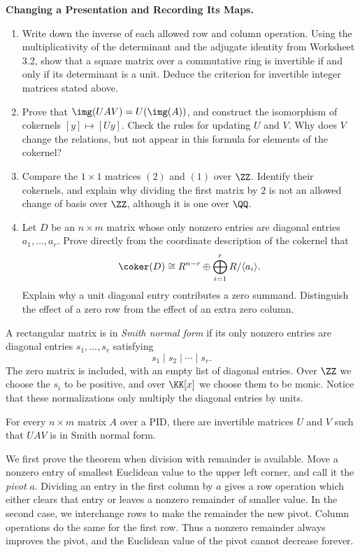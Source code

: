 \documentclass[12pt,reqno]{amsart}
\begin{document}
\begin{problems}
\item\label{s:presentations} \textbf{Changing a Presentation and Recording Its Maps.}
\begin{enumerate}
\item Write down the inverse of each allowed row and column operation. Using the multiplicativity of the determinant and the adjugate identity from Worksheet 3.2, show that a square matrix over a commutative ring is invertible if and only if its determinant is a unit. Deduce the criterion for invertible integer matrices stated above.
\item Prove that $\img(UAV)=U(\img(A))$, and construct the isomorphism of cokernels $[y]\mapsto[Uy]$. Check the rules for updating $U$ and $V$. Why does $V$ change the relations, but not appear in this formula for elements of the cokernel?
\item Compare the $1\times1$ matrices $(2)$ and $(1)$ over $\ZZ$. Identify their cokernels, and explain why dividing the first matrix by $2$ is not an allowed change of basis over $\ZZ$, although it is one over $\QQ$.
\item Let $D$ be an $n\times m$ matrix whose only nonzero entries are diagonal entries $a_1,\ldots,a_r$. Prove directly from the coordinate description of the cokernel that
\[
\coker(D)\cong R^{n-r}\oplus\bigoplus_{i=1}^rR/\langle a_i\rangle.
\]
Explain why a unit diagonal entry contributes a zero summand. Distinguish the effect of a zero row from the effect of an extra zero column.
\end{enumerate}
\end{problems}

\hrulefill

A rectangular matrix is in \emph{Smith normal form} if its only nonzero entries are diagonal entries $s_1,\ldots,s_r$ satisfying
\[
s_1\mid s_2\mid\cdots\mid s_r.
\]
The zero matrix is included, with an empty list of diagonal entries. Over $\ZZ$ we choose the $s_i$ to be positive, and over $\KK[x]$ we choose them to be monic. Notice that these normalizations only multiply the diagonal entries by units.

\begin{theorem}
For every $n\times m$ matrix $A$ over a PID, there are invertible matrices $U$ and $V$ such that $UAV$ is in Smith normal form.
\end{theorem}

We first prove the theorem when division with remainder is available. Move a nonzero entry of smallest Euclidean value to the upper left corner, and call it the \emph{pivot} $a$. Dividing an entry in the first column by $a$ gives a row operation which either clears that entry or leaves a nonzero remainder of smaller value. In the second case, we interchange rows to make the remainder the new pivot. Column operations do the same for the first row. Thus a nonzero remainder always improves the pivot, and the Euclidean value of the pivot cannot decrease forever.
\end{document}

